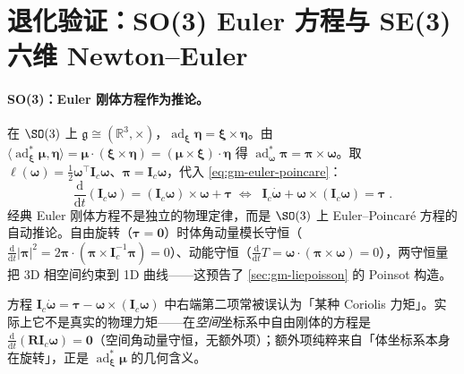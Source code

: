 \section{退化验证：SO(3) Euler 方程与 SE(3) 六维 Newton--Euler}
\label{sec:gm-degenerate}

\paragraph{SO(3)：Euler 刚体方程作为推论。}
在 $\SO(3)$ 上 $\mathfrak g\cong(\mathbb R^3,\times)$，$\operatorname{ad}_{\boldsymbol\xi}\boldsymbol\eta=\boldsymbol\xi\times\boldsymbol\eta$。由 $\langle\operatorname{ad}^*_{\boldsymbol\xi}\boldsymbol\mu,\boldsymbol\eta\rangle=\boldsymbol\mu\cdot(\boldsymbol\xi\times\boldsymbol\eta)=(\boldsymbol\mu\times\boldsymbol\xi)\cdot\boldsymbol\eta$ 得 $\operatorname{ad}^*_{\boldsymbol\omega}\boldsymbol\pi=\boldsymbol\pi\times\boldsymbol\omega$。取 $\ell(\boldsymbol\omega)=\tfrac12\boldsymbol\omega^\top\mathbf I_c\boldsymbol\omega$、$\boldsymbol\pi=\mathbf I_c\boldsymbol\omega$，代入 \cref{eq:gm-euler-poincare}：
\begin{equation}
  \frac{\mathrm d}{\mathrm dt}(\mathbf I_c\boldsymbol\omega)=(\mathbf I_c\boldsymbol\omega)\times\boldsymbol\omega+\boldsymbol\tau
  \;\Longleftrightarrow\;
  \boxed{\;\mathbf I_c\dot{\boldsymbol\omega}+\boldsymbol\omega\times(\mathbf I_c\boldsymbol\omega)=\boldsymbol\tau\;}.
  \label{eq:gm-euler-rigid}
\end{equation}
经典 Euler 刚体方程不是独立的物理定律，而是 $\SO(3)$ 上 Euler--Poincaré 方程的自动推论。自由旋转（$\boldsymbol\tau=\mathbf0$）时体角动量模长守恒（$\tfrac{\mathrm d}{\mathrm dt}|\boldsymbol\pi|^2=2\boldsymbol\pi\cdot(\boldsymbol\pi\times\mathbf I_c^{-1}\boldsymbol\pi)=0$）、动能守恒（$\tfrac{\mathrm d}{\mathrm dt}T=\boldsymbol\omega\cdot(\boldsymbol\pi\times\boldsymbol\omega)=0$），两守恒量把 3D 相空间约束到 1D 曲线——这预告了 \cref{sec:gm-liepoisson} 的 Poinsot 构造。

\begin{pitfall}
方程 $\mathbf I_c\dot{\boldsymbol\omega}=\boldsymbol\tau-\boldsymbol\omega\times(\mathbf I_c\boldsymbol\omega)$ 中右端第二项常被误认为「某种 Coriolis 力矩」。实际上它不是真实的物理力矩——在\emph{空间}坐标系中自由刚体的方程是 $\tfrac{\mathrm d}{\mathrm dt}(\mathbf R\mathbf I_c\boldsymbol\omega)=\mathbf0$（空间角动量守恒，无额外项）；额外项纯粹来自「体坐标系本身在旋转」，正是 $\operatorname{ad}^*_{\boldsymbol\xi}\boldsymbol\mu$ 的几何含义。
\end{pitfall}

